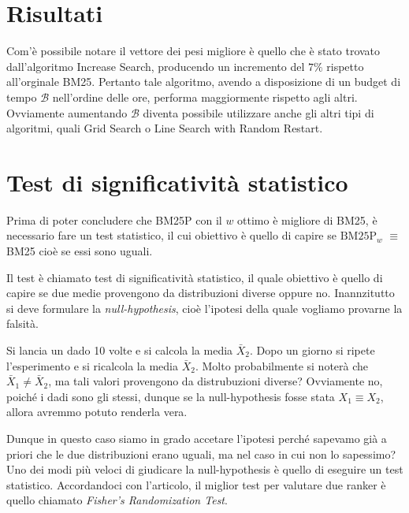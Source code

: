 \section{Risultati}

Com'è possibile notare il vettore dei pesi migliore è quello che è stato trovato
dall'algoritmo Increase Search, producendo un incremento del $7\%$  rispetto all'orginale BM25.
Pertanto tale algoritmo, avendo a disposizione di un budget di tempo $\mathcal{B}$ nell'ordine
delle ore, performa maggiormente rispetto agli altri.
Ovviamente aumentando $\mathcal{B}$ diventa possibile utilizzare anche gli altri
tipi di algoritmi, quali Grid Search o Line Search with Random Restart.

\section{Test di significatività statistico}

Prima di poter concludere che BM25P con il $w$ ottimo è migliore di BM25, è necessario
fare un test statistico, il cui obiettivo è quello di capire se $\text{BM25P}_w$ $\equiv$ BM25
cioè se essi sono uguali.

Il test è chiamato test di significatività statistico, il quale obiettivo
è quello di capire se due medie provengono da distribuzioni diverse oppure no.
Inannzitutto si deve formulare la \textit{null-hypothesis}, cioè l'ipotesi
della quale vogliamo provarne la falsità.

\begin{esempio}
	Si lancia un dado 10 volte e si calcola la media $\bar{X}_2$. Dopo un giorno si ripete l'esperimento
	e si ricalcola la media $\bar{X}_2$. Molto probabilmente si noterà che $\bar{X}_1 \neq \bar{X}_2$,
	ma tali valori provengono da distrubuzioni diverse?
	Ovviamente no, poiché i dadi sono gli stessi, dunque se la null-hypothesis fosse
	stata $X_1 \equiv X_2$, allora avremmo potuto renderla vera.
\end{esempio}

Dunque in questo caso siamo in grado accetare l'ipotesi perché
sapevamo già a priori che le due distribuzioni erano uguali, ma nel caso
in cui non lo sapessimo?
Uno dei modi più veloci di giudicare la null-hypothesis è quello di eseguire un test statistico.
Accordandoci con l'articolo\cite{10.1145/1321440.1321528}, il miglior test per valutare
due ranker è quello chiamato \textit{Fisher's Randomization Test}.

